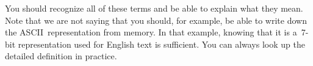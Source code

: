 \vfill

\pagebreak

You should recognize all of these terms
and be able to explain what they mean.
%
%
Note that we are not saying that you should, for example, be able to 
write down the ASCII~representation from memory.  In that example, 
knowing that it is a~\mbox{7-bit} representation used for English
text is sufficient.  You can always look up the detailed definition 
in practice.

